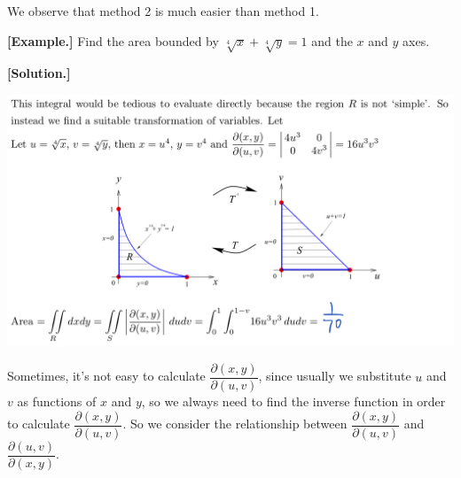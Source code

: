 \documentclass[11pt, a4paper]{MATH2023}
\newcommand{\eg}{\textbf{[Example.] }}
\newcommand{\sol}{\textbf{[Solution.] }}
\begin{document}
\begin{spacing}{1.3}
    We observe that method 2 is much easier than method 1.

    \newpage
    \eg Find the area bounded by $\sqrt[4]{x}+\sqrt[4]{y}=1$ and the $x$ and $y$ axes.

    \sol

    \includegraphics[scale=0.24]{images/Ch14-jacobian-eg2.jpeg}

    \vspace{0.2in}
    Sometimes, it's not easy to calculate $\dfrac{\partial(x, y)}{\partial(u, v)}$, 
    since usually we substitute $u$ and $v$ as functions of $x$ and $y$, so we always need to find the inverse 
    function in order to calculate $\dfrac{\partial(x, y)}{\partial(u, v)}$. So we consider the relationship 
    between  $\dfrac{\partial(x, y)}{\partial(u, v)}$ and $\dfrac{\partial(u, v)}{\partial(x, y)}$.


\end{spacing}
\end{document}
